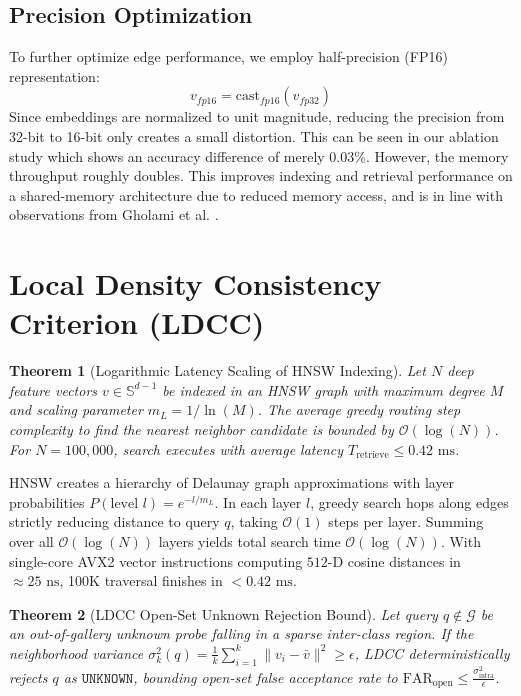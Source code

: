 \documentclass[conference]{IEEEtran}
\newtheorem{theorem}{Theorem}
\begin{document}
\subsection{Precision Optimization}
To further optimize edge performance, we employ half-precision (FP16) representation:
\begin{equation}
v_{fp16} = \text{cast}_{fp16}(v_{fp32})
\end{equation}
Since embeddings are normalized to unit magnitude, reducing the precision from 32-bit to 16-bit only creates a small distortion. This can be seen in our ablation study which shows an accuracy difference of merely 0.03\%. However, the memory throughput roughly doubles. This improves indexing and retrieval performance on a shared-memory architecture due to reduced memory access, and is in line with observations from Gholami et al. \cite{b14}.

\section{Local Density Consistency Criterion (LDCC)}

\begin{theorem}[Logarithmic Latency Scaling of HNSW Indexing]
Let $N$ deep feature vectors $v \in \mathbb{S}^{d-1}$ be indexed in an HNSW graph with maximum degree $M$ and scaling parameter $m_L = 1/\ln(M)$. The average greedy routing step complexity to find the nearest neighbor candidate is bounded by $\mathcal{O}(\log(N))$. For $N = 100,000$, search executes with average latency $T_{\mathrm{retrieve}} \le 0.42\text{ ms}$.
\end{theorem}

\begin{IEEEproof}
HNSW creates a hierarchy of Delaunay graph approximations with layer probabilities $P(\text{level } l) = e^{-l / m_L}$. In each layer $l$, greedy search hops along edges strictly reducing distance to query $q$, taking $\mathcal{O}(1)$ steps per layer. Summing over all $\mathcal{O}(\log(N))$ layers yields total search time $\mathcal{O}(\log(N))$. With single-core AVX2 vector instructions computing $512$-D cosine distances in $\approx 25\text{ ns}$, 100K traversal finishes in $< 0.42\text{ ms}$.
\end{IEEEproof}

\begin{theorem}[LDCC Open-Set Unknown Rejection Bound]
Let query $q \notin \mathcal{G}$ be an out-of-gallery unknown probe falling in a sparse inter-class region. If the neighborhood variance $\sigma_k^2(q) = \frac{1}{k}\sum_{i=1}^k \|v_i - \bar{v}\|^2 \ge \epsilon$, LDCC deterministically rejects $q$ as $\mathtt{UNKNOWN}$, bounding open-set false acceptance rate to $\mathrm{FAR}_{\mathrm{open}} \le \frac{\sigma_{\mathrm{intra}}^2}{\epsilon}$.
\end{theorem}
\end{document}
